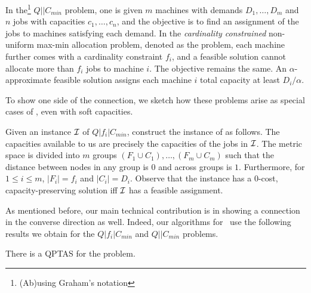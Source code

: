 \begin{definition}
In the\footnote{(Ab)using Graham's notation} $Q||C_{min}$ problem, one is given $m$ machines with demands $D_1,\ldots,D_m$ and $n$ jobs with capacities $c_1,\ldots,c_n$,
and the objective is to find an assignment of the jobs to machines satisfying each demand.
In the {\em cardinality constrained}  non-uniform max-min allocation problem, denoted as the \cckp problem, each machine further comes with a cardinality constraint $f_i$, and a feasible solution cannot allocate more than $f_i$ jobs to machine $i$. The objective remains the same. An $\alpha$-approximate feasible solution assigns each machine $i$  total capacity at least $ D_i/\alpha$.
\end{definition}
\noindent

To show one side of the connection, we sketch how these problems arise as special cases
of \mckc, even with soft capacities.
\begin{remark}\label{rem:cckp}
	Given an instance ${\cal I}$ of $Q|f_i|C_{min}$, construct the instance of \mckc as follows. The capacities available to us are precisely the capacities of the jobs in ${\cal I}$. The metric space is divided into $m$ groups $(F_1\cup C_1),\ldots,(F_m\cup C_m)$ such that the distance between nodes in any group is $0$ and across groups is $1$. Furthermore, for $1\leq i\leq m$, $|F_i| = f_i$ and $|C_i| = D_i$. Observe that the \mckc instance has a $0$-cost, capacity-preserving solution iff ${\cal I}$ has a feasible assignment.
\end{remark}

As mentioned before, our main technical contribution is in showing a connection in the converse direction as well. Indeed, our algorithms for~ use the following results we obtain for the $Q|f_i|C_{min}$ and $Q||C_{min}$ problems.

\begin{theorem}\label{thm:q}
	There is a QPTAS for the \cckp problem.
\end{theorem}


